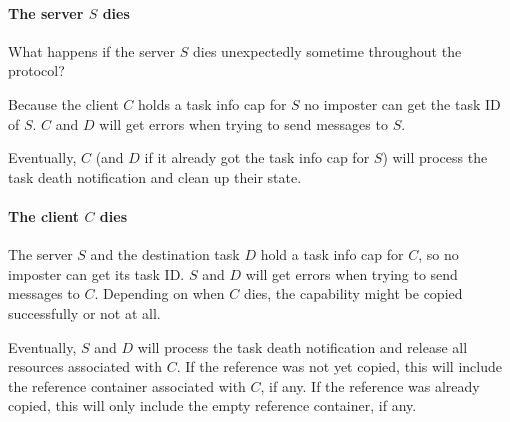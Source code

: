 \paragraph{The server $S$ dies}
What happens if the server $S$ dies unexpectedly sometime throughout
the protocol?

\begin{comment}
  At any time a task dies, the task info caps it held are released.
  Also, task death notifications are sent to any task that holds task
  info caps to the now dead task.  The task death notifications will
  be processed asynchrnouly, so they might be processed immediately,
  or at any later time, even much later after the task died!  So one
  important thing to keep in mind is that the release of task info
  caps a task held, and other tasks noticing the task death, are
  always some time apart.
\end{comment}

Because the client $C$ holds a task info cap for $S$ no imposter can
get the task ID of $S$.  $C$ and $D$ will get errors when trying to
send messages to $S$.

\begin{comment}
  You might now wonder what happens if $C$ also dies, or if $C$ is
  malicious and does not hold the task info cap.  You can use this as
  an exercise, and try to find the answer on your own.  The answers
  are below.
\end{comment}

Eventually, $C$ (and $D$ if it already got the task info cap for $S$)
will process the task death notification and clean up their state.

\paragraph{The client $C$ dies}
The server $S$ and the destination task $D$ hold a task info cap for
$C$, so no imposter can get its task ID.  $S$ and $D$ will get errors
when trying to send messages to $C$.  Depending on when $C$ dies, the
capability might be copied successfully or not at all.

Eventually, $S$ and $D$ will process the task death notification and
release all resources associated with $C$.  If the reference was not
yet copied, this will include the reference container associated with
$C$, if any.  If the reference was already copied, this will only
include the empty reference container, if any.

\begin{comment}
  Of course, the participants need to use internal locking to protect
  the integrity of their internal data structures.  The above protocol
  does not show where locks are required.  In the few cases where some
  actions must be performed atomically, a wording is used that
  suggests that.
\end{comment}

